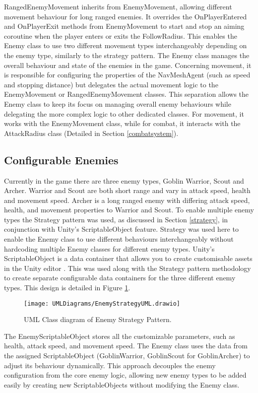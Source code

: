 \documentclass[10pt]{final_report}
\begin{document}
RangedEnemyMovement inherits from EnemyMovement, allowing different movement behaviour for long ranged enemies. It overrides the OnPlayerEntered and OnPlayerExit methods from EnemyMovement to start and stop an aiming coroutine when the player enters or exits the FollowRadius. This enables the Enemy class to use two different movement types interchangeably depending on the enemy type, similarly to the strategy pattern.
The Enemy class manages the overall behaviour and state of the enemies in the game. Concerning movement, it is responsible for configuring the properties of the NavMeshAgent (such as speed and stopping distance) but delegates the actual movement logic to the EnemyMovement or RangedEnemyMovement classes. This separation allows the Enemy class to keep its focus on managing overall enemy behaviours while delegating the more complex logic to other dedicated classes. For movement, it works with the EnemyMovement class, while for combat, it interacts with the AttackRadius class (Detailed in Section \ref{combatsystem}). 

\subsection{Configurable Enemies}
Currently in the game there are three enemy types, Goblin Warrior, Scout and Archer. Warrior and Scout are both  short range and vary in attack speed, health and movement speed. Archer is a long ranged enemy with differing attack speed, health, and movement properties to Warrior and Scout. To enable multiple enemy types the Strategy pattern was used, as discussed in Section \ref{strategy}, in conjunction with Unity's ScriptableObject feature. Strategy was used here to enable the Enemy class to use different behaviours interchangeably without hardcoding multiple Enemy classes for different enemy types. Unity's ScriptableObject is a data container that allows you to create customisable assets in the Unity editor \cite{unity2024_ScriptableObject}. This was used along with the Strategy pattern methodology to create separate configurable data containers for the three different enemy types. This design is detailed in Figure \ref{fig:label_strategy}.
\begin{figure}[H]
    \centering
    \texttt{[image: UMLDiagrams/EnemyStrategyUML.drawio]}
    \caption{UML Class diagram of Enemy Strategy Pattern.}
    \label{fig:label_strategy}
\end{figure}
The EnemyScriptableObject stores all the customizable parameters, such as health, attack speed, and movement speed. The Enemy class uses the data from the assigned ScriptableObject (GoblinWarrior, GoblinScout for GoblinArcher) to adjust its behaviour dynamically. This approach decouples the enemy configuration from the core enemy logic, allowing new enemy types to be added easily by creating new ScriptableObjects without modifying the Enemy class. 
\end{document}
